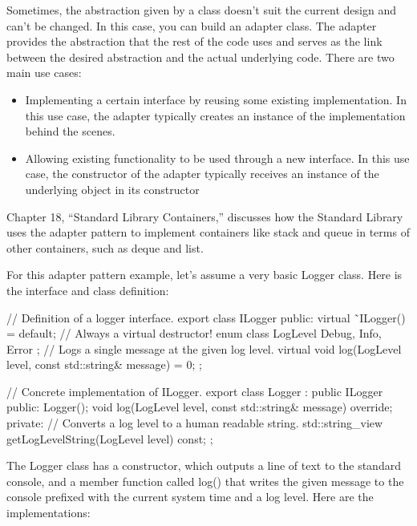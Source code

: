 Sometimes, the abstraction given by a class doesn’t suit the current design and can’t be changed. In this case, you can build an adapter class. The adapter provides the abstraction that the rest of the code uses and serves as the link between the desired abstraction and the actual underlying code. There are two main use cases:

\begin{itemize}
\item
Implementing a certain interface by reusing some existing implementation. In this use case, the adapter typically creates an instance of the implementation behind the scenes.

\item
Allowing existing functionality to be used through a new interface. In this use case, the constructor of the adapter typically receives an instance of the underlying object in its constructor
\end{itemize}

Chapter 18, “Standard Library Containers,” discusses how the Standard Library uses the adapter pattern to implement containers like stack and queue in terms of other containers, such as deque and list.


For this adapter pattern example, let’s assume a very basic Logger class. Here is the interface and class definition:

\begin{cpp}
// Definition of a logger interface.
export class ILogger
{
    public:
        virtual ˜ILogger() = default; // Always a virtual destructor!
        enum class LogLevel { Debug, Info, Error };
        // Logs a single message at the given log level.
        virtual void log(LogLevel level, const std::string& message) = 0;
};

// Concrete implementation of ILogger.
export class Logger : public ILogger
{
    public:
        Logger();
        void log(LogLevel level, const std::string& message) override;
    private:
        // Converts a log level to a human readable string.
        std::string_view getLogLevelString(LogLevel level) const;
};
\end{cpp}

The Logger class has a constructor, which outputs a line of text to the standard console, and a member function called log() that writes the given message to the console prefixed with the current system time and a log level. Here are the implementations:

